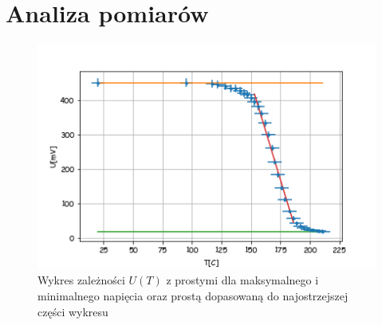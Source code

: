 \documentclass[a4paper,10pt]{article}
\begin{document}
\section{Analiza pomiarów}

\begin{figure}[H]
  \includegraphics{./Curie_proste.png}
  \caption{Wykres zależności $U(T)$ z prostymi dla maksymalnego i minimalnego napięcia oraz prostą dopasowaną do najostrzejszej części wykresu}
\end{figure}
\end{document}
